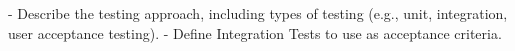 - Describe the testing approach, including types of testing (e.g., unit, integration, user acceptance testing).
- Define Integration Tests to use as acceptance criteria.